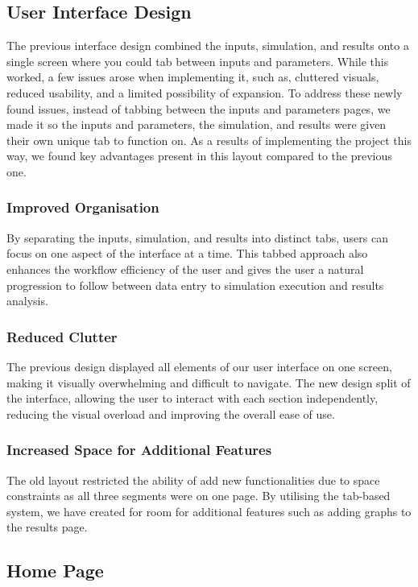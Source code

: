 \documentclass{article}
\begin{document}
    \subsection{User Interface Design}
    The previous interface design combined the inputs, simulation, and results onto a single screen where you could tab between inputs and parameters. While this worked, 
    a few issues arose when implementing it, such as, cluttered visuals, reduced usability, and a limited possibility of expansion. To address these newly found issues, 
    instead of tabbing between the inputs and parameters pages, we made it so the inputs and parameters, the simulation, and results were given their own unique tab to 
    function on. As a results of implementing the project this way, we found key advantages present in this layout compared to the previous one.

        \subsubsection{Improved Organisation}
        By separating the inputs, simulation, and results into distinct tabs, users can focus on one aspect of the interface at a time. This tabbed approach also enhances 
        the workflow efficiency of the user and gives the user a natural progression to follow between data entry to simulation execution and results analysis.

        \subsubsection{Reduced Clutter}
        The previous design displayed all elements of our user interface on one screen, making it visually overwhelming and difficult to navigate. The new design split of 
        the interface, allowing the user to interact with each section independently, reducing the visual overload and improving the overall ease of use.

        \subsubsection{Increased Space for Additional Features}
        The old layout restricted the ability of add new functionalities due to space constraints as all three segments were on one page. By utilising the tab-based system, 
        we have created for room for additional features such as adding graphs to the results page.

    \subsection{Home Page}
\end{document}
